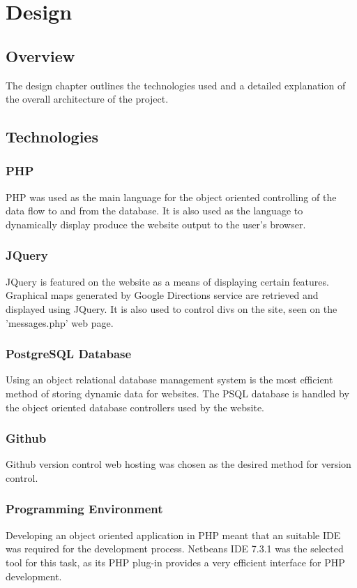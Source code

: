 \chapter{Design}

\section{Overview}
The design chapter outlines the technologies used and a detailed explanation of the overall architecture of the project.

\section{Technologies}
	\subsection{PHP}
		PHP was used as the main language for the object oriented controlling of the data flow to and from the database. It is also used as the language to dynamically display produce the website output to the user's browser.
		
	\subsection{JQuery}
		JQuery is featured on the website as a means of displaying certain features. Graphical maps generated by Google Directions \cite{google_directions_api} service are retrieved and displayed using JQuery. It is also used to control divs on the site, seen on the 'messages.php' web page.
			
	\subsection{PostgreSQL Database}
	Using an object relational database management system is the most efficient method of storing dynamic data for websites. The PSQL database is handled by the object oriented database controllers used by the website.
	
	\subsection{Github}
		Github \cite{github} version control web hosting was chosen as the desired method for version control.
		
	\subsection{Programming Environment}
		Developing an object oriented application in PHP meant that an suitable IDE was required for the development process. Netbeans IDE 7.3.1 was the selected tool for this task, as its PHP plug-in provides a very efficient interface for PHP development. 
		 
